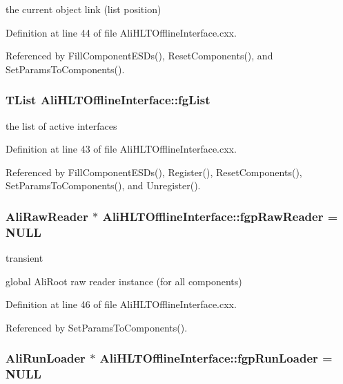 the current object link (list position) 

Definition at line 44 of file Ali\-HLTOffline\-Interface.cxx.

Referenced by Fill\-Component\-ESDs(), Reset\-Components(), and Set\-Params\-To\-Components().
\subsubsection{\setlength{\rightskip}{0pt plus 5cm}TList {\bf Ali\-HLTOffline\-Interface::fg\-List}\hspace{0.3cm}{\tt  [static, private]}}\label{classAliHLTOfflineInterface_v0}


the list of active interfaces 

Definition at line 43 of file Ali\-HLTOffline\-Interface.cxx.

Referenced by Fill\-Component\-ESDs(), Register(), Reset\-Components(), Set\-Params\-To\-Components(), and Unregister().
\subsubsection{\setlength{\rightskip}{0pt plus 5cm}Ali\-Raw\-Reader $\ast$ {\bf Ali\-HLTOffline\-Interface::fgp\-Raw\-Reader} = NULL\hspace{0.3cm}{\tt  [static, private]}}\label{classAliHLTOfflineInterface_v3}


transient 

global Ali\-Root raw reader instance (for all components) 

Definition at line 46 of file Ali\-HLTOffline\-Interface.cxx.

Referenced by Set\-Params\-To\-Components().
\subsubsection{\setlength{\rightskip}{0pt plus 5cm}Ali\-Run\-Loader $\ast$ {\bf Ali\-HLTOffline\-Interface::fgp\-Run\-Loader} = NULL\hspace{0.3cm}{\tt  [static, private]}}\label{classAliHLTOfflineInterface_v2}



